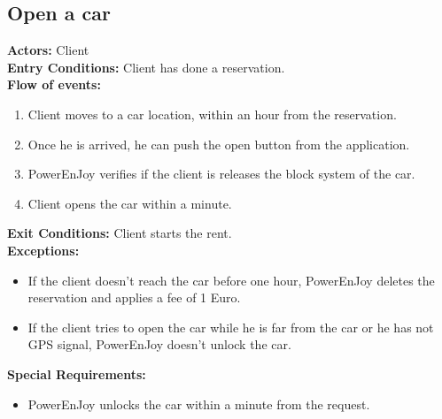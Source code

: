 \subsection{Open a car}
%
\textbf{Actors:}
Client \\
%
\textbf{Entry Conditions:}
Client has done a reservation. \\
%
\textbf{Flow of events:}
\begin{enumerate}
\item Client moves to a car location, within an hour from the reservation.
\item Once he is arrived, he can push the open button from the application.
\item PowerEnJoy verifies if the client is  releases the block system of the car.
\item Client opens the car within a minute.
\end{enumerate}
%
\textbf{Exit Conditions:}
Client starts the rent. \\
%
\textbf{Exceptions:}
\begin{itemize}
\item If the client doesn't reach the car before one hour, PowerEnJoy deletes the reservation and applies a fee of 1 Euro.
\item If the client tries to open the car while he is far from the car or he has not GPS signal, PowerEnJoy doesn't unlock the car.
\end{itemize}
%
\textbf{Special Requirements:}
\begin{itemize}
\item PowerEnJoy unlocks the car within a minute from the request.
\end{itemize}



